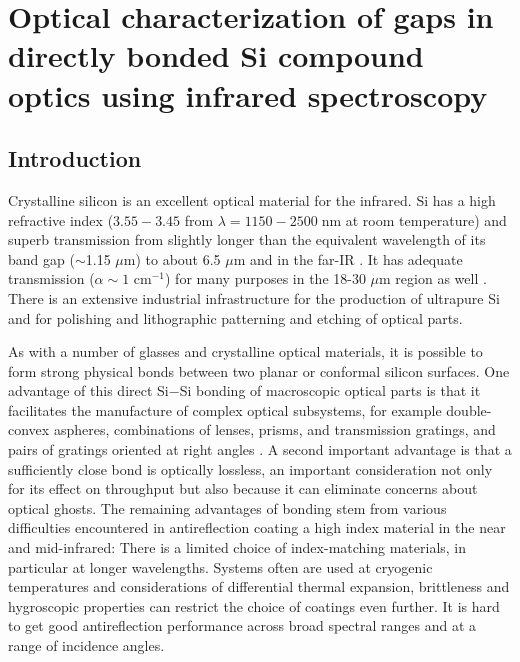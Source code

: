\chapter{Optical characterization of gaps in directly bonded Si compound optics using infrared spectroscopy}
\label{ch_SiGaps}

\section{Introduction}

Crystalline silicon is an excellent optical material for the infrared. Si has a high refractive index ($3.55-3.45$ from $\lambda = 1150-2500\;$nm at room temperature) and superb transmission from slightly longer than the equivalent wavelength of its band gap ($\sim$1.15 $\mu$m) to about 6.5 $\mu$m \cite{PhysRev.108.268,PhysRev.78.178} and in the far-IR \cite{doi:10.1117/12.323764}.  It has adequate transmission  ($\alpha \sim 1$ cm$^{-1}$) for many purposes in the 18-30 $\mu$m region as well \cite{doi:10.1117/12.323764}.  There is an extensive industrial infrastructure for the production of ultrapure Si and for polishing and lithographic patterning and etching of optical parts.

As with a number of glasses and crystalline optical materials, it is possible to form strong physical bonds between two planar or conformal silicon surfaces.  One advantage of this direct Si$-$Si bonding of macroscopic optical parts is that it facilitates the manufacture of complex optical subsystems, for example double-convex aspheres, combinations of lenses, prisms, and transmission gratings, and pairs of gratings oriented at right angles \cite{2012SPIE.8450E..2TV,2010SPIE.7739E.123G}.  A second important advantage is that a sufficiently close bond is optically lossless, an important consideration not only for its effect on throughput but also because it can eliminate concerns about optical ghosts.  The remaining advantages of bonding stem from various difficulties encountered in antireflection coating a high index material in the near and mid-infrared:  There is a limited choice of index-matching materials, in particular at longer wavelengths.  Systems often are used at cryogenic temperatures and considerations of differential thermal expansion, brittleness and hygroscopic properties can restrict the choice of coatings even further. It is hard to get good antireflection performance across broad spectral ranges and at a range of incidence angles.


